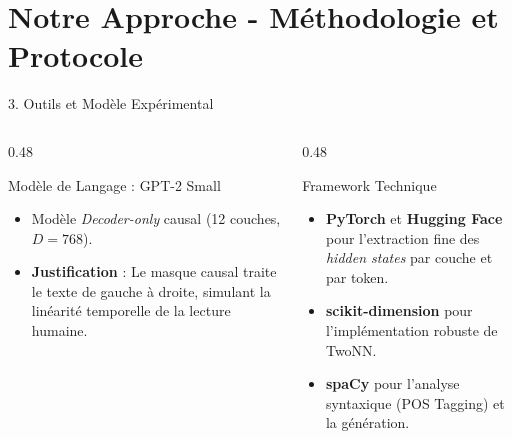 \documentclass[t, aspectratio=169]{beamer}
\begin{document}
\section{Notre Approche - Méthodologie et Protocole}

\begin{frame}{3. Outils et Modèle Expérimental}
  \begin{columns}[t]
    \begin{column}{0.48\textwidth}
      \begin{block}{Modèle de Langage : GPT-2 Small}
        \small
        \begin{itemize}
          \item Modèle \textit{Decoder-only} causal (12 couches, $D = 768$).
          \item \textbf{Justification} : Le masque causal traite le texte de gauche à droite, simulant la linéarité temporelle de la lecture humaine.
        \end{itemize}
      \end{block}
    \end{column}
    
    \begin{column}{0.48\textwidth}
      \begin{block}{Framework Technique}
        \small
        \begin{itemize}
          \item \textbf{PyTorch} et \textbf{Hugging Face} pour l'extraction fine des \textit{hidden states} par couche et par token.
          \item \textbf{scikit-dimension} pour l'implémentation robuste de TwoNN.
          \item \textbf{spaCy} pour l'analyse syntaxique (POS Tagging) et la génération.
        \end{itemize}
      \end{block}
    \end{column}
  \end{columns}
\end{frame}
\end{document}
